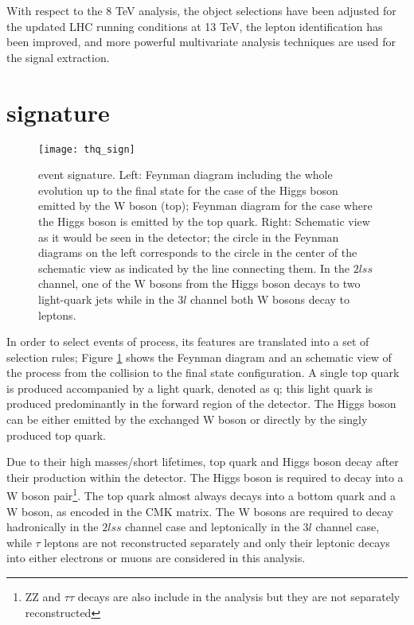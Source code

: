 With respect to the 8 TeV analysis, the object selections have been adjusted for the updated LHC running conditions at 13 TeV, the lepton identification has been improved, and more powerful multivariate analysis techniques are used for the signal extraction.


\section{\tHq signature}\label{sec:thw_sign}

\begin{figure}[!h]
\begin{center}
\texttt{[image: thq\_sign]}
\end{center}
\caption[\tHq event signature]{\tHq event signature. Left: Feynman diagram including the whole evolution up to the final state for the case of the Higgs boson emitted by the W boson (top); Feynman diagram for the case where the Higgs boson is emitted by the top quark. Right: Schematic view as it would be seen in the detector; the circle in the Feynman diagrams on the left corresponds to the circle in the center of the schematic view as indicated by the line connecting them. In the $2lss$ channel, one of the W bosons from the Higgs boson decays to two light-quark jets while in the $3l$ channel both W bosons decay to leptons.}
\label{fig:thq_sign}
\end{figure}

In order to select events of \tHq process, its features are translated into a set of selection rules; Figure \ref{fig:thq_sign} shows the Feynman diagram and an schematic view of the \tHq process from the \pp collision to the final state configuration. A single top quark is produced accompanied by a light quark, denoted as q; this light quark is produced predominantly in the forward region of the detector. The Higgs boson can be either emitted by the exchanged W boson or directly by the singly produced top quark.

Due to their high masses/short lifetimes, top quark and Higgs boson decay after their production within the detector. The Higgs boson is required to decay into a W boson pair\footnote{ZZ and $\tau\tau$ decays are also include in the analysis but they are not separately reconstructed}. The top quark almost always decays into a bottom quark and a W boson, as encoded in the CMK matrix. The W bosons are required to decay hadronically in the $2lss$ channel case and leptonically in the $3l$ channel case, while $\tau$ leptons are not reconstructed separately and only their leptonic decays into either electrons or muons are considered in this analysis.

